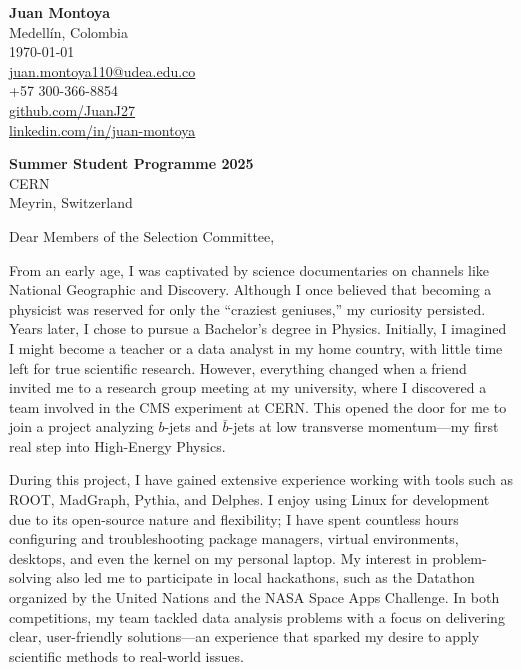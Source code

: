 \documentclass[11pt]{report}
\begin{document}
\begin{titlepage}

    \begin{minipage}[t]{0.95\textwidth}
        \hfill
        \raggedleft
        \textbf{ Juan Montoya} \\
        Medellín, Colombia \\
        \today\\
        \href{mailto:juan.montoya110@udea.edu.co}{juan.montoya110@udea.edu.co} \\
        +57 300-366-8854 \\
        \href{https://github.com/JuanJ27}{github.com/JuanJ27} \\
        \href{https://www.linkedin.com/in/juan-montoya-68262071/}{linkedin.com/in/juan-montoya}
    \end{minipage}

\raggedright \textbf{Summer Student Programme 2025} \\ CERN \\ Meyrin, Switzerland

\vspace{0.7em}

\raggedright Dear Members of the Selection Committee,\\

\vspace{0.4em}

From an early age, I was captivated by science documentaries on channels like National Geographic and Discovery. Although I once believed that becoming a physicist was reserved for only the “craziest geniuses,” my curiosity persisted. Years later, I chose to pursue a Bachelor’s degree in Physics. Initially, I imagined I might become a teacher or a data analyst in my home country, with little time left for true scientific research. However, everything changed when a friend invited me to a research group meeting at my university, where I discovered a team involved in the CMS experiment at CERN. This opened the door for me to join a project analyzing $b$-jets and $ \bar b$-jets at low transverse momentum—my first real step into High-Energy Physics.

\vspace{0.7em}

During this project, I have gained extensive experience working with tools such as ROOT, MadGraph, Pythia, and Delphes. I enjoy using Linux for development due to its open-source nature and flexibility; I have spent countless hours configuring and troubleshooting package managers, virtual environments, desktops, and even the kernel on my personal laptop. My interest in problem-solving also led me to participate in local hackathons, such as the Datathon organized by the United Nations and the NASA Space Apps Challenge. In both competitions, my team tackled data analysis problems with a focus on delivering clear, user-friendly solutions—an experience that sparked my desire to apply scientific methods to real-world issues.


\end{titlepage}
\end{document}
